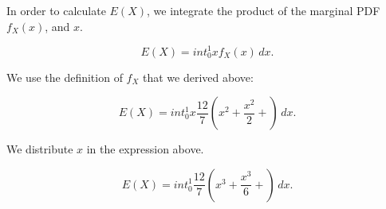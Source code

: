 \documentclass[a5paper,11pt]{article}
\begin{document}
In order to calculate $E\left(X \right)$,
we integrate the product of the marginal 
PDF $f_X \left(x \right)$, and $x$.

\begin{equation}
E\left( X \right) =
int_0^1 x f_X \left( x \right)\,dx.
\end{equation}

We use the definition of $f_X$ that we
derived above:

\begin{equation}
E\left( X \right) =
int_0^1 x \frac{12}{7} 
  \left(x^2 + \frac{x^2}{2} + \right)\,dx. 
\end{equation} 



We distribute $x$ in the expression above.

\begin{equation}
E\left( X \right) =
int_0^1  \frac{12}{7} 
  \left(x^3 + \frac{x^3}{6} + \right)\,dx. 
\end{equation}

\printbibliography{}
\end{document}
